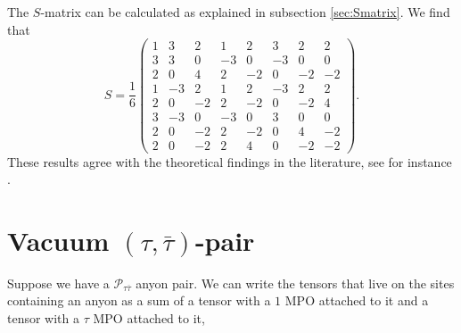 \documentclass[12 pt]{article}
\begin{document}
\begin{center}
\begin{tabular}{ c || c | c | c | c | c | c | c | c |}
    \hline
  \end{tabular}
\end{center}
\normalsize
The $S$-matrix can be calculated as explained in subsection \ref{sec:Smatrix}. We find that
$$
S=\frac{1}{6}
\begin{pmatrix}

     1 &    3  &   2   &  1   &  2   &  3   &  2  &   2\\
     3  &   3  &   0  &  -3   &  0  &  -3  &   0  &   0\\
     2  &   0   &  4  &   2  &  -2  &   0  &  -2  &  -2\\
     1  &  -3  &   2   &  1  &   2  &  -3   &  2  &   2\\
     2  &   0   & -2  &   2 &   -2   &  0   & -2  &   4\\
     3  &  -3  &   0  &  -3  &   0   &  3 &    0   &  0\\
     2  &   0  &  -2 &    2  &  -2   &  0  &   4  &  -2\\
     2 &    0  &  -2   &  2  &   4   &  0  &  -2  &  -2
\end{pmatrix}.
$$
These results agree with the theoretical findings in the literature, see for instance \cite{DS3}.

\section{Vacuum $(\tau,\bar{\tau})$-pair} 

Suppose we have a $\mathcal{P}_{\tau\overline{\tau}}$ anyon pair. We can write the tensors that live on the sites containing an anyon as a sum of a tensor with a $1$ MPO attached to it and a tensor with a $\tau$ MPO attached to it,
\end{document}

